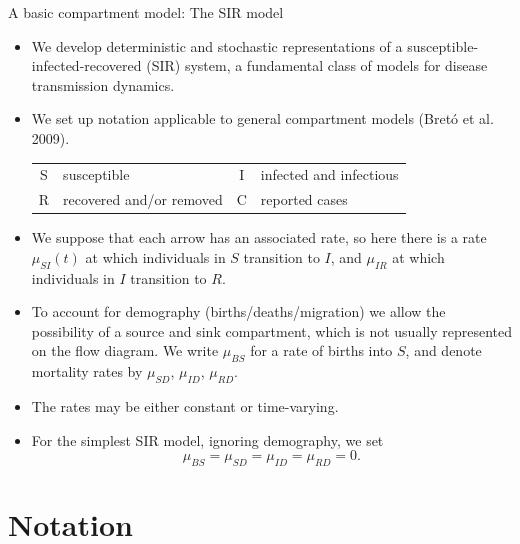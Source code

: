 \documentclass[
  ignorenonframetext,
  aspectratio=169,
  t]{beamer}
\theoremstyle{definition}
\begin{document}
\begin{frame}[allowframebreaks]{A basic compartment model: The SIR
model}
\label{a-basic-compartment-model-the-sir-model}
\begin{itemize}
\item
  We develop deterministic and stochastic representations of a
  susceptible-infected-recovered (SIR) system, a fundamental class of
  models for disease transmission dynamics.
\item
  We set up notation applicable to general compartment models (Bretó et
  al. 2009).  \vspace{5mm}

  \begin{tabular}{c @{\ :\ } l c @{\ :\ } l}
    S & susceptible & I & infected and infectious  \\
    R & recovered and/or removed  & C & reported cases
  \end{tabular}
\item
  We suppose that each arrow has an associated rate, so here there is a
  rate \(\mu_{SI}(t)\) at which individuals in \(S\) transition to
  \(I\), and \(\mu_{IR}\) at which individuals in \(I\) transition to
  \(R\).
\item
  To account for demography (births/deaths/migration) we allow the
  possibility of a source and sink compartment, which is not usually
  represented on the flow diagram. We write \(\mu_{BS}\) for a rate of
  births into \(S\), and denote mortality rates by \(\mu_{SD}\),
  \(\mu_{ID}\), \(\mu_{RD}\).
\item
  The rates may be either constant or time-varying.
\item
  For the simplest SIR model, ignoring demography, we set
  \[ \mu_{BS}=\mu_{SD}=\mu_{ID}=\mu_{RD}=0.\]
\end{itemize}
\end{frame}

\section{Notation}\label{notation}
\end{document}
